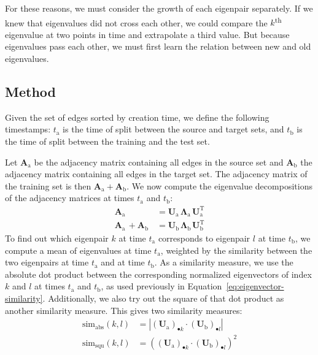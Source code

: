 \documentclass[11pt,a4paper]{book}
\begin{document}
For these reasons, we must consider the growth of each eigenpair
separately.  
If we knew that eigenvalues did not cross each other, we
could compare the $k$\textsuperscript{th} eigenvalue at two points in time and
extrapolate a third value.  But because eigenvalues pass each other, we
must first learn the relation between new and old eigenvalues.

\subsection{Method}
Given the set of edges sorted by creation time, we define the following 
timestamps: $t_{\mathrm a}$ is the time of split between the source
and target sets, and
$t_{\mathrm b}$ is the time of split between the training and the
test set. 

Let $\mathbf A_{\mathrm a}$ be the adjacency matrix containing all edges in the
source set and $\mathbf A_{\mathrm b}$ the adjacency matrix containing all edges
in the target set.  The adjacency matrix of the training set is then $\mathbf
A_{\mathrm a} + \mathbf A_{\mathrm b}$. 
We now compute the eigenvalue decompositions of the adjacency matrices
at times $t_{\mathrm a}$ and $t_{\mathrm b}$:
\begin{align*}
  \mathbf A_{\mathrm a}^{\phantom{\mathrm T}} &= \mathbf U_{\mathrm a}^{\phantom{\mathrm T}} \mathbf
  \Lambda_{\mathrm a}^{\phantom{\mathrm T}} \mathbf U_{\mathrm a}^{\mathrm T}  \\
  \mathbf A_{\mathrm a}^{\phantom{\mathrm T}} + \mathbf A_{\mathrm b}^{\phantom{\mathrm T}}
  &= \mathbf U_{\mathrm b}^{\phantom{\mathrm T}} \mathbf 
  \Lambda_{\mathrm b}^{\phantom{\mathrm T}} \mathbf U_{\mathrm b}^{\mathrm T} 
\end{align*}
To find out which eigenpair $k$ at time $t_{\mathrm a}$ corresponds to eigenpair
$l$ at time $t_{\mathrm b}$, we compute a mean of eigenvalues at time $t_{\mathrm a}$,
weighted by the similarity between the two eigenpairs at time
$t_{\mathrm a}$ and at time
$t_{\mathrm b}$.  As a similarity measure, we use the absolute dot product
between the corresponding normalized eigenvectors of index $k$ and $l$ at times
$t_{\mathrm a}$ and $t_{\mathrm b}$, as used previously in
Equation~\ref{eq:eigenvector-similarity}.  Additionally, we also try out
the square of that dot product as another similarity measure.  This
gives two similarity measures:
\begin{align}
  \mathrm{sim}_{\mathrm{abs}}(k,l) &=
  \left|(\mathbf U_{\mathrm a})_{\bullet k} \cdot (\mathbf
  U_{\mathrm b})_{\bullet l}\right|
  \label{eq:extrapolation-abs}
  \\
  \mathrm{sim}_{\mathrm{squ}}(k,l) &=
  \left( (\mathbf U_{\mathrm a})_{\bullet k} \cdot (\mathbf
  U_{\mathrm b})_{\bullet l} \right)^2
  \label{eq:extrapolation-squ}
\end{align}
\end{document}
